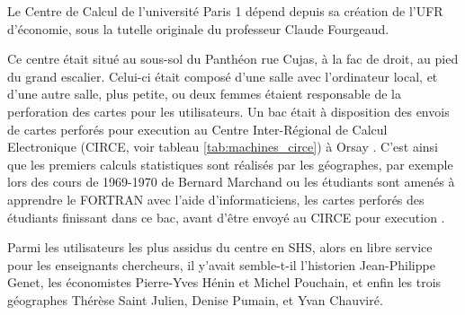 





Le Centre de Calcul de l'université Paris 1 dépend depuis sa création de l'UFR d'économie, sous la tutelle originale du professeur Claude Fourgeaud.

Ce centre était situé au sous-sol du Panthéon rue Cujas, à la fac de droit, au pied du grand escalier. Celui-ci était composé d'une salle avec l'ordinateur local, et d'une autre salle, plus petite, ou deux femmes étaient responsable de la perforation des cartes pour les utilisateurs. Un bac était à disposition des envois de cartes perforés pour execution au Centre Inter-Régional de Calcul Electronique (CIRCE, voir tableau \ref{tab:machines_circe}) à Orsay  . C'est ainsi que les premiers calculs statistiques sont réalisés par les géographes, par exemple lors des cours de 1969-1970 de Bernard Marchand ou les étudiants sont amenés à apprendre le FORTRAN avec l'aide d'informaticiens, les cartes perforés des étudiants finissant dans ce bac, avant d'être envoyé au CIRCE pour execution \autocite[127]{Cuyala2014}.

Parmi les utilisateurs les plus assidus du centre en SHS, alors en libre service pour les enseignants chercheurs, il y'avait semble-t-il l'historien Jean-Philippe Genet, les économistes Pierre-Yves Hénin et Michel Pouchain, et enfin les trois géographes Thérèse Saint Julien, Denise Pumain, et Yvan Chauviré.

